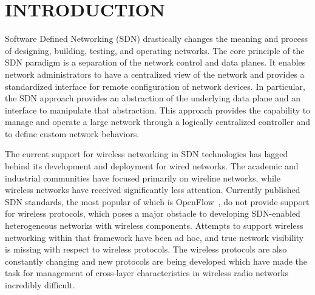 %
%
%



\pagestyle{plain} %
\setcounter{page}{1}


\chapter{\uppercase {Introduction}}

\label{sec:intro}


Software Defined Networking (SDN) drastically changes the meaning and process of designing, building, testing, and operating networks. The core principle of the SDN paradigm is a separation of the network control and data planes. It enables network administrators to have a centralized view of the network and provides a standardized interface for remote configuration of network devices. In particular, the SDN approach provides an abstraction of the underlying data plane and an interface to manipulate that abstraction. This approach provides the capability to manage and operate a large network through a logically centralized controller and to define custom network behaviors.

The current support for wireless networking in SDN technologies has lagged behind its development and deployment for wired networks. The academic and industrial communities have focused primarily on wireline networks, while wireless networks have received significantly less attention.
Currently published SDN standards, the most popular of which is OpenFlow~\cite{openflow}, do not provide support for wireless protocols, which poses a major obstacle to developing SDN-enabled heterogeneous networks with wireless components. Attempts to support wireless networking within that framework have been ad hoc, and true network visibility is missing with respect to wireless protocols. The wireless protocols are also constantly changing and new protocols are being developed which have made the task for management of cross-layer characteristics in wireless radio networks incredibly difficult.

